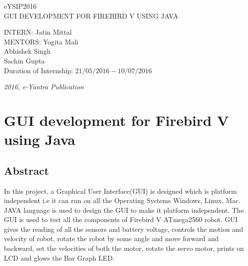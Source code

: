 \documentclass[a4paper,12pt,oneside]{book}
\begin{document}
\begin{titlepage}
\raggedright
{\Large eYSIP2016\\[1cm]}
{\Huge\scshape GUI DEVELOPMENT FOR FIREBIRD V USING JAVA \\[.1in]}
\vfill
\begin{flushright}
{\large INTERN: Jatin Mittal\\}
{\large MENTORS: Yogita Mali \\}
{\large Abhishek Singh \\}
{\large Sachin Gupta \\}
{\large Duration of Internship: $ 21/05/2016-10/07/2016 $ \\}
\end{flushright}

{\itshape 2016, e-Yantra Publication}
\end{titlepage}

\chapter[Project Tag]{GUI development for Firebird V using Java}
\section*{Abstract}
	In this project, a Graphical User Interface(GUI) is designed which is platform independent i.e it can run on all the Operating Systems Windows, Linux, Mac. JAVA language is used to design the GUI to make it platform independent. The GUI is used to test all the components of Firebird V ATmega2560 robot. GUI gives the reading of all the sensors and battery voltage, controls the motion and velocity of robot, rotate the robot by some angle and move forward and backward, set the velocities of both the motor, rotate the servo motor, prints on LCD and glows the Bar Graph LED.
\newpage
\end{document}
